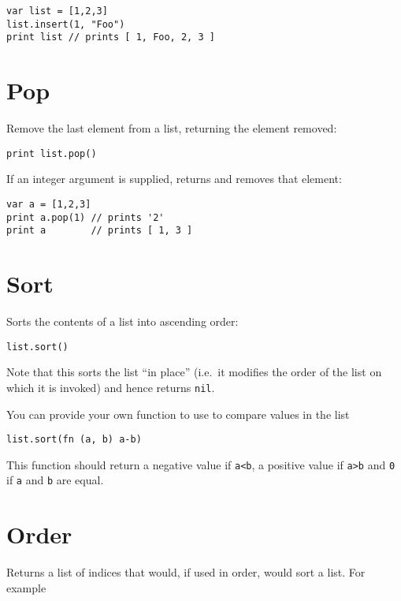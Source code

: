 \begin{lstlisting}
var list = [1,2,3]
list.insert(1, "Foo")
print list // prints [ 1, Foo, 2, 3 ]
\end{lstlisting}

\hypertarget{pop}{%
\section{Pop}\label{pop}}

Remove the last element from a list, returning the element removed:

\begin{lstlisting}
print list.pop()
\end{lstlisting}

If an integer argument is supplied, returns and removes that element:

\begin{lstlisting}
var a = [1,2,3]
print a.pop(1) // prints '2'
print a        // prints [ 1, 3 ]
\end{lstlisting}

\hypertarget{sort}{%
\section{Sort}\label{sort}}

Sorts the contents of a list into ascending order:

\begin{lstlisting}
list.sort()
\end{lstlisting}

Note that this sorts the list ``in place'' (i.e.~it modifies the order
of the list on which it is invoked) and hence returns \texttt{nil}.

You can provide your own function to use to compare values in the list

\begin{lstlisting}
list.sort(fn (a, b) a-b)
\end{lstlisting}

This function should return a negative value if \texttt{a\textless{}b},
a positive value if \texttt{a\textgreater{}b} and \texttt{0} if
\texttt{a} and \texttt{b} are equal.

\hypertarget{order}{%
\section{Order}\label{order}}

Returns a list of indices that would, if used in order, would sort a
list. For example

